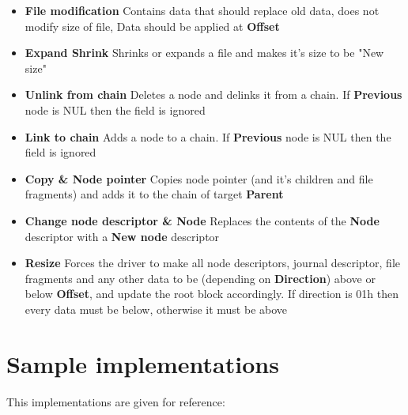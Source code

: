 \documentclass[12pt]{article}
\begin{document}
\begin{itemize}
	\item \textbf{File modification} Contains data that should replace old data, does not modify size of file, Data should be applied at \textbf{Offset}
	\item \textbf{Expand Shrink} Shrinks or expands a file and makes it's size to be "New size"
	\item \textbf{Unlink from chain} Deletes a node and delinks it from a chain. If \textbf{Previous} node is NUL then the field is ignored
	\item \textbf{Link to chain} Adds a node to a chain. If \textbf{Previous} node is NUL then the field is ignored
	\item \textbf{Copy \& Node pointer} Copies node pointer (and it's children and file fragments) and adds it to the chain of target \textbf{Parent}
	\item \textbf{Change node descriptor \& Node} Replaces the contents of the \textbf{Node} descriptor with a \textbf{New node} descriptor
	\item \textbf{Resize} Forces the driver to make all node descriptors, journal descriptor, file fragments and any other data to be (depending on \textbf{Direction}) above or below \textbf{Offset}, and update the root block accordingly. If direction is 01h then every data must be below, otherwise it must be above
\end{itemize}

\newpage

\section{Sample implementations}
This implementations are given for reference:
\end{document}
